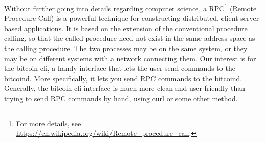 \bigskip
\noindent
Without further going into details regarding computer science, a RPC\footnote{For more details, see \url{https://en.wikipedia.org/wiki/Remote\_procedure\_call}.} (Remote Procedure Call) is a powerful technique for constructing distributed, client-server based applications. It is based on the extension of the conventional procedure calling, so that the called procedure need not exist in the same address space as the calling procedure. The two processes may be on the same system, or they may be on different systems with a network connecting them. Our interest is for the \colorbox{Grey!10}{bitcoin-cli}, a handy interface that lets the user send commands to the \colorbox{Grey!10}{bitcoind}. More specifically, it lets you send RPC commands to the \colorbox{Grey!10}{bitcoind}. Generally, the \colorbox{Grey!10}{bitcoin-cli} interface is much more clean and user friendly than trying to send RPC commands by hand, using \colorbox{Grey!10}{curl} or some other method.

